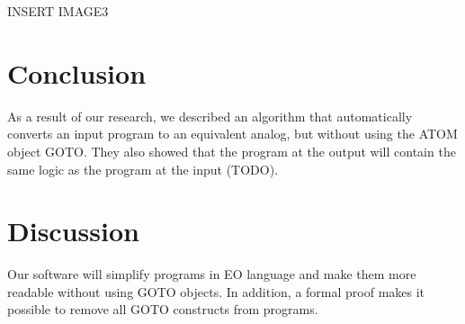 \documentclass[sigplan,review,11pt,nonacm,natbib=false]{acmart}
\begin{document}
{INSERT IMAGE3}

\section{Conclusion}
As a result of our research, we described an algorithm that automatically converts an input program to an equivalent analog, but without using the ATOM object GOTO. They also showed that the program at the output will contain the same logic as the program at the input (TODO).

\section{Discussion}
Our software will simplify programs in EO language and make them more readable without using GOTO objects. In addition, a formal proof makes it possible to remove all GOTO constructs from programs.
\end{document}
